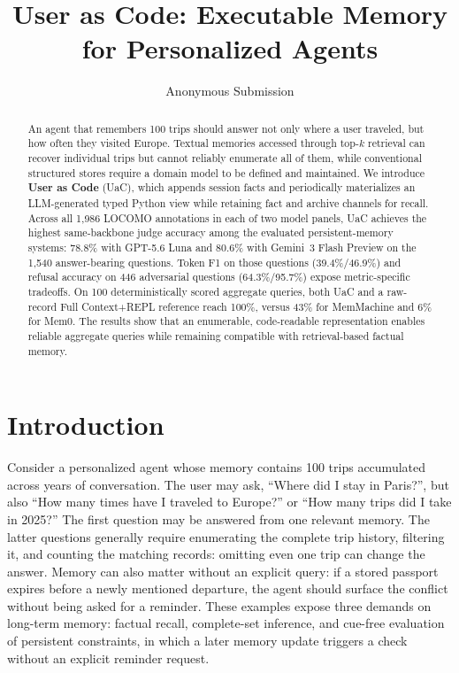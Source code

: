 \documentclass[letterpaper]{article} %
\title{User as Code: Executable Memory for Personalized Agents}
\author{
    Anonymous Submission
}
\begin{document}
\maketitle

\begin{abstract}
An agent that remembers 100 trips should answer not only where a user traveled, but how often they visited Europe. Textual memories accessed through top-$k$ retrieval can recover individual trips but cannot reliably enumerate all of them, while conventional structured stores require a domain model to be defined and maintained. We introduce \textbf{User as Code} (UaC), which appends session facts and periodically materializes an LLM-generated typed Python view while retaining fact and archive channels for recall. Across all 1{,}986 LOCOMO annotations in each of two model panels, UaC achieves the highest same-backbone judge accuracy among the evaluated persistent-memory systems: 78.8\% with GPT-5.6 Luna and 80.6\% with Gemini~3 Flash Preview on the 1{,}540 answer-bearing questions. Token F1 on those questions (39.4\%/46.9\%) and refusal accuracy on 446 adversarial questions (64.3\%/95.7\%) expose metric-specific tradeoffs. On 100 deterministically scored aggregate queries, both UaC and a raw-record Full Context+REPL reference reach 100\%, versus 43\% for MemMachine and 6\% for Mem0. The results show that an enumerable, code-readable representation enables reliable aggregate queries while remaining compatible with retrieval-based factual memory.
\end{abstract}


\section{Introduction}
\label{sec:intro}

Consider a personalized agent whose memory contains 100 trips accumulated across years of conversation. The user may ask, ``Where did I stay in Paris?'', but also ``How many times have I traveled to Europe?'' or ``How many trips did I take in 2025?'' The first question may be answered from one relevant memory. The latter questions generally require enumerating the complete trip history, filtering it, and counting the matching records: omitting even one trip can change the answer. Memory can also matter without an explicit query: if a stored passport expires before a newly mentioned departure, the agent should surface the conflict without being asked for a reminder. These examples expose three demands on long-term memory: factual recall, complete-set inference, and cue-free evaluation of persistent constraints, in which a later memory update triggers a check without an explicit reminder request.
\end{document}
